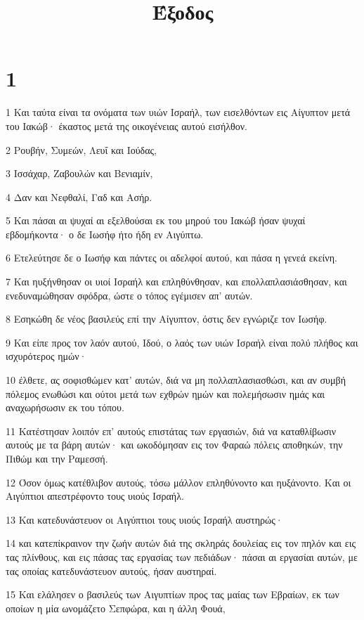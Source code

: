 

\title{Έξοδος}


\chapter{1}

\par 1 Και ταύτα είναι τα ονόματα των υιών Ισραήλ, των εισελθόντων εις Αίγυπτον μετά του Ιακώβ· έκαστος μετά της οικογένειας αυτού εισήλθον.
\par 2 Ρουβήν, Συμεών, Λευΐ και Ιούδας,
\par 3 Ισσάχαρ, Ζαβουλών και Βενιαμίν,
\par 4 Δαν και Νεφθαλί, Γαδ και Ασήρ.
\par 5 Και πάσαι αι ψυχαί αι εξελθούσαι εκ του μηρού του Ιακώβ ήσαν ψυχαί εβδομήκοντα· ο δε Ιωσήφ ήτο ήδη εν Αιγύπτω.
\par 6 Ετελεύτησε δε ο Ιωσήφ και πάντες οι αδελφοί αυτού, και πάσα η γενεά εκείνη.
\par 7 Και ηυξήνθησαν οι υιοί Ισραήλ και επληθύνθησαν, και επολλαπλασιάσθησαν, και ενεδυναμώθησαν σφόδρα, ώστε ο τόπος εγέμισεν απ' αυτών.
\par 8 Εσηκώθη δε νέος βασιλεύς επί την Αίγυπτον, όστις δεν εγνώριζε τον Ιωσήφ.
\par 9 Και είπε προς τον λαόν αυτού, Ιδού, ο λαός των υιών Ισραήλ είναι πολύ πλήθος και ισχυρότερος ημών·
\par 10 έλθετε, ας σοφισθώμεν κατ' αυτών, διά να μη πολλαπλασιασθώσι, και αν συμβή πόλεμος ενωθώσι και ούτοι μετά των εχθρών ημών και πολεμήσωσιν ημάς και αναχωρήσωσιν εκ του τόπου.
\par 11 Κατέστησαν λοιπόν επ' αυτούς επιστάτας των εργασιών, διά να καταθλίβωσιν αυτούς με τα βάρη αυτών· και ωκοδόμησαν εις τον Φαραώ πόλεις αποθηκών, την Πιθώμ και την Ραμεσσή.
\par 12 Όσον όμως κατέθλιβον αυτούς, τόσω μάλλον επληθύνοντο και ηυξάνοντο. Και οι Αιγύπτιοι απεστρέφοντο τους υιούς Ισραήλ.
\par 13 Και κατεδυνάστευον οι Αιγύπτιοι τους υιούς Ισραήλ αυστηρώς·
\par 14 και κατεπίκραινον την ζωήν αυτών διά της σκληράς δουλείας εις τον πηλόν και εις τας πλίνθους, και εις πάσας τας εργασίας των πεδιάδων· πάσαι αι εργασίαι αυτών, με τας οποίας κατεδυνάστευον αυτούς, ήσαν αυστηραί.
\par 15 Και ελάλησεν ο βασιλεύς των Αιγυπτίων προς τας μαίας των Εβραίων, εκ των οποίων η μία ωνομάζετο Σεπφώρα, και η άλλη Φουά,
